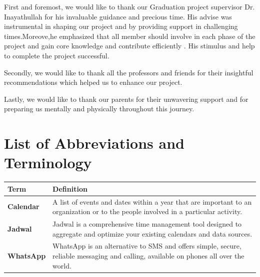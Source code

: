 \documentclass[12pt,a4paper]{report}
\begin{document}
\begin{singlespace}
\begin{justify}
First and foremost, we would like to thank our Graduation project supervisor Dr. Inayathullah for his invaluable guidance and precious time. His advise was instrumental in shaping our project and by providing support in challenging times.Moreove,he emphasized that all member should involve in each phase of the project and gain core knowledge and contribute efficiently .
His stimulus and help to complete the project successful.
  


Secondly, we would like to thank all the professors and friends for their insightful recommendations which helped us to enhance our project.
    


Lastly, we would like to thank our parents for their unwavering support and for preparing us mentally and physically throughout this journey.
\end{justify}
    
\newpage

\tableofcontents

\newpage
\listoffigures


\newpage
\listoftables

\chapter*{List of Abbreviations and Terminology}

\begin{center}
    \begin{longtable}{p{}p{}}
    \toprule
    \textbf{Term} & \textbf{Definition} \\
    \midrule
    \endhead
    
    \textbf{Calendar} & A list of events and dates within a year that are important to an organization or to the people involved in a particular activity. \cite{def:calendar} \\[1ex]
    
    \textbf{Jadwal} & Jadwal is a comprehensive time management tool designed to aggregate and optimize your existing calendars and data sources. \\[1ex]
    
    \textbf{WhatsApp} & WhatsApp is an alternative to SMS and offers simple, secure, reliable messaging and calling, available on phones all over the world. \cite{whatsapp-about} \\[1ex]
    

\end{longtable}
\end{center}
\end{singlespace}
\end{document}
